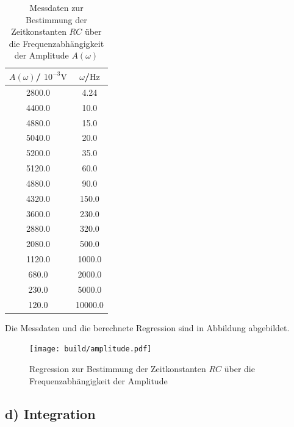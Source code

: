 \begin{table}
	\caption{Messdaten zur Bestimmung der Zeitkonstanten $RC$ über die Frequenzabhängigkeit der Amplitude $A(\omega)$}
	\label{tab:tab2}
	\centering
	\begin{tabular}{cc}
		\toprule
		$A(\omega)$/ $10^{-3} \si{\volt}$ & $\omega$/$\si{\Hz}$ \\
		\midrule
		2800.0                            & 4.24                \\
		4400.0                            & 10.0                \\
		4880.0                            & 15.0                \\
		5040.0                            & 20.0                \\
		5200.0                            & 35.0                \\
		5120.0                            & 60.0                \\
		4880.0                            & 90.0                \\
		4320.0                            & 150.0               \\
		3600.0                            & 230.0               \\
		2880.0                            & 320.0               \\
		2080.0                            & 500.0               \\
		1120.0                            & 1000.0              \\
		680.0                             & 2000.0              \\
		230.0                             & 5000.0              \\
		120.0                             & 10000.0             \\
		\bottomrule
	\end{tabular}
\end{table}

Die Messdaten und die berechnete Regression sind in Abbildung  abgebildet.
\begin{figure}
	\centering
	\texttt{[image: build/amplitude.pdf]}
	\caption{Regression zur Bestimmung der Zeitkonstanten $RC$ über die Frequenzabhängigkeit der Amplitude}
	\label{fig:plotb}
\end{figure}

\subsection{d) Integration}

